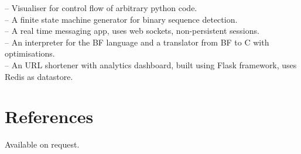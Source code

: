 \documentclass[mm]{simple_style}
\begin{document}
\begin{resume}
\href{https://github.com/say4n/flow}{} -- Visualiser for control flow of arbitrary python code.\\
\href{https://github.com/say4n/fsmutil}{} -- A finite state machine generator for binary sequence detection.\\
\href{https://github.com/say4n/pyscuss}{} – A real time messaging app, uses web sockets, non-persistent sessions.\\
\href{https://github.com/say4n/bfutil}{} -- An interpreter for the BF language and a translator from BF to C with optimisations.\\
\href{https://github.com/say4n/LinkTo}{} -- An URL shortener with analytics dashboard, built using Flask framework, uses Redis as datastore.

\vspace{-2ex}
\sectionline

\section{References}

Available on request.

\vspace{-2ex}
\sectionline

\vfill
\hfill \color{mgray}{Last updated on \today}


\end{resume}
\end{document}

